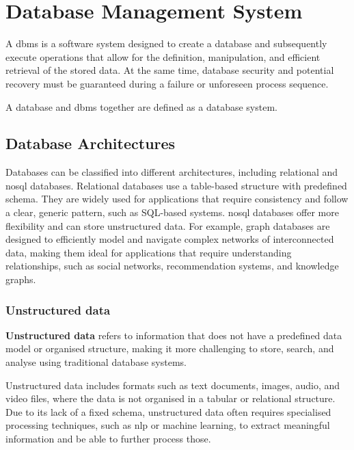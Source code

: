 \section{Database Management System}\label{sec:Database Management System}
\begin{definition}\label{def:Database Management System}
    A \ac{dbms}  is a software system designed to create a database and subsequently execute operations that allow for the definition, manipulation, and efficient retrieval of the stored data. 
    At the same time, database security and potential recovery must be guaranteed during a failure or unforeseen process sequence. \citep{limited2010introduction}
\end{definition}
A database and \ac{dbms} together are defined as a database system.  

\subsection{Database Architectures}\label{sec:database-architectures}
Databases can be classified into different architectures, including relational and \ac{nosql} databases. 
Relational databases use a table-based structure with predefined schema. 
They are widely used for applications that require consistency and follow a clear, generic pattern, such as SQL-based systems.
\ac{nosql} databases offer more flexibility and can store unstructured data. 
For example, graph databases are designed to efficiently model and navigate complex networks of interconnected data, making them ideal for applications that require understanding relationships, such as social networks, recommendation systems, and knowledge graphs.
\subsubsection{Unstructured data}\label{sec:unstructured-data}
\begin{definition}\label{def:unstructured-data}
    \textbf{Unstructured data} refers to information that does not have a predefined data model or organised structure, making it more challenging to store, search, and analyse using traditional database systems.
\end{definition}
Unstructured data includes formats such as text documents, images, audio, and video files, where the data is not organised in a tabular or relational structure. 
Due to its lack of a fixed schema, unstructured data often requires specialised processing techniques, such as \ac{nlp} or machine learning, to extract meaningful information and be able to further process those.
